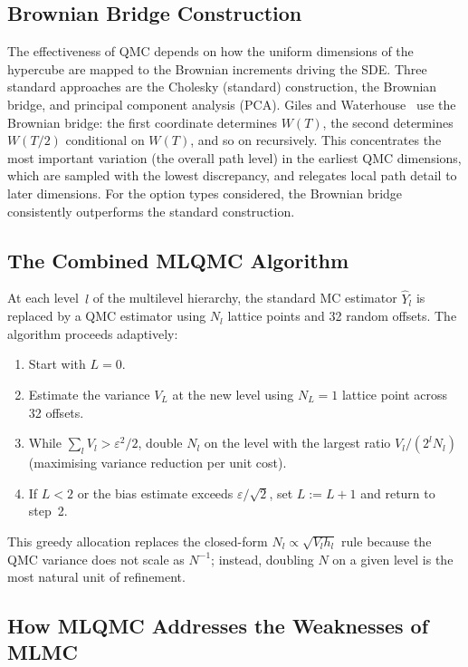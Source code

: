 \documentclass[11pt]{article}
\begin{document}
\subsection{Brownian Bridge Construction}

The effectiveness of QMC depends on how the uniform dimensions of the hypercube are mapped to the Brownian increments driving the SDE. Three standard approaches are the Cholesky (standard) construction, the Brownian bridge, and principal component analysis (PCA). Giles and Waterhouse~\cite{giles2009} use the Brownian bridge: the first coordinate determines $W(T)$, the second determines $W(T/2)$ conditional on $W(T)$, and so on recursively. This concentrates the most important variation (the overall path level) in the earliest QMC dimensions, which are sampled with the lowest discrepancy, and relegates local path detail to later dimensions. For the option types considered, the Brownian bridge consistently outperforms the standard construction.

\subsection{The Combined MLQMC Algorithm}

At each level~$l$ of the multilevel hierarchy, the standard MC estimator $\hat{Y}_{l}$ is replaced by a QMC estimator using $N_{l}$ lattice points and 32 random offsets. The algorithm proceeds adaptively:
\begin{enumerate}
\item Start with $L = 0$.
\item Estimate the variance $V_{L}$ at the new level using $N_{L} = 1$ lattice point across 32 offsets.
\item While $\sum_{l} V_{l} > \varepsilon^{2}/2$, double $N_{l}$ on the level with the largest ratio $V_{l}/(2^{l}N_{l})$ (maximising variance reduction per unit cost).
\item If $L < 2$ or the bias estimate exceeds $\varepsilon/\sqrt{2}$, set $L := L + 1$ and return to step~2.
\end{enumerate}
This greedy allocation replaces the closed-form $N_{l} \propto \sqrt{V_{l}h_{l}}$ rule because the QMC variance does not scale as $N^{-1}$; instead, doubling $N$ on a given level is the most natural unit of refinement.

\subsection{How MLQMC Addresses the Weaknesses of MLMC}
\end{document}
